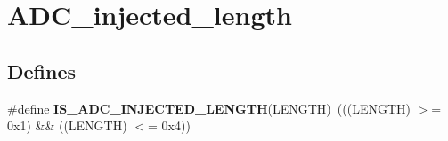 \hypertarget{group__ADC__injected__length}{
\section{ADC\_\-injected\_\-length}
\label{group__ADC__injected__length}
}
\subsection*{Defines}
\begin{DoxyCompactItemize}
\item 
\hypertarget{group__ADC__injected__length_gaecdddab7424a697722683296ca70e176}{
\#define {\bfseries IS\_\-ADC\_\-INJECTED\_\-LENGTH}(LENGTH)~(((LENGTH) $>$= 0x1) \&\& ((LENGTH) $<$= 0x4))}
\label{group__ADC__injected__length_gaecdddab7424a697722683296ca70e176}

\end{DoxyCompactItemize}

